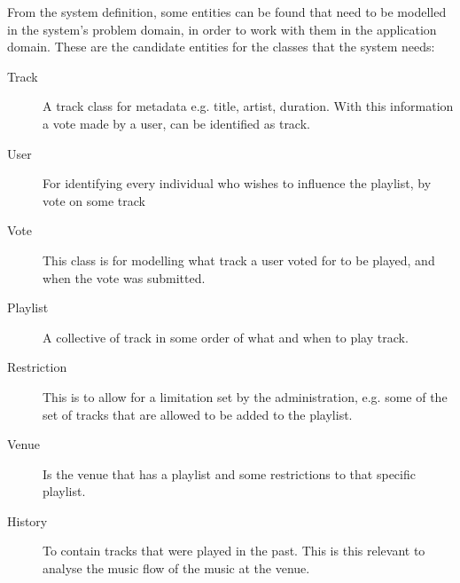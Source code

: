 From the system definition, some entities can be found that need to be modelled in the system's problem domain, in order to work with them in the application domain. These are the candidate entities for the classes that the system needs:
\begin{description}
    \item[Track]
    A track class for metadata e.g. title, artist, duration. With this information a vote made by a user, can be identified as track.
    \item[User]
    For identifying every individual who wishes to influence the playlist, by vote on some track
    \item[Vote]
    This class is for modelling what track a user voted for to be played, and when the vote was submitted.
    \item[Playlist]
    A collective of track in some order of what and when to play track.
    \item[Restriction]
    This is to allow for a limitation set by the administration, e.g. some of the set of tracks that are allowed to be added to the playlist.
    \item[Venue]
    Is the venue that has a playlist and some restrictions to that specific playlist.
    \item[History]
    To contain tracks that were played in the past. This is this
    relevant to analyse the music flow of the music at the venue.
\end{description}
